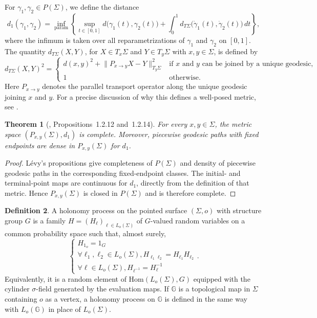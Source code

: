 \documentclass[11pt,a4paper,reqno]{article}
\newtheorem{theorem}{Theorem}[section]
\theoremstyle{definition}
\newtheorem{definition}[theorem]{Definition}
\theoremstyle{remark}
\newcommand\Hom{\mathrm{Hom}}
\newcommand\Gbb{{\mathbb{G}}}
\begin{document}
For $\gamma_1,\gamma_2\in P(\Sigma)$, we define the distance
\begin{equation}
 d_1(\gamma_1,\gamma_2)
 = \inf_{\text{param}} \left\{
 \sup_{t\in [0,1]} d\big(\gamma_1(t),\gamma_2(t)\big)
 + \int_0^1 d_{T\Sigma}\big(\dot{\gamma}_1(t),\dot{\gamma}_2(t)\big)\,dt
 \right\},
\end{equation}
where the infimum is taken over all reparametrizations of $\gamma_1$ and $\gamma_2$ on $[0,1]$. 
The quantity $d_{T\Sigma}(X,Y)$, for $X\in T_x\Sigma$ and $Y\in T_y\Sigma$ with $x,y\in \Sigma$, is defined by
\begin{equation}
 d_{T\Sigma}(X,Y)^2= 
 \begin{cases}
 d(x,y)^2 + \big\|P_{x\to y}X - Y\big\|_{T_y\Sigma}^2 
 & \text{if $x$ and $y$ can be joined by a unique geodesic}, \\
 1 & \text{otherwise}.
 \end{cases}
\end{equation}
Here $P_{x\to y}$ denotes the parallel transport operator along the unique geodesic joining $x$ and $y$. 
For a precise discussion of why this defines a well-posed metric, see \cite[Section~1.2.2]{Lev10}.
\begin{theorem}[\cite{Lev10}, Propositions~1.2.12 and~1.2.14]
\label{thm:Levy-d1-complete-rewrite}
For every $x,y\in\Sigma$, the metric space $(P_{x,y}(\Sigma),d_1)$ is complete. Moreover, piecewise geodesic paths with fixed endpoints are dense in $P_{x,y}(\Sigma)$ for $d_1$.
\end{theorem}

\begin{proof}
L\'evy's propositions give completeness of $P(\Sigma)$ and density of piecewise geodesic paths in the corresponding fixed-endpoint classes. The initial- and terminal-point maps are continuous for $d_1$, directly from the definition of that metric. Hence $P_{x,y}(\Sigma)$ is closed in $P(\Sigma)$ and is therefore complete.
\end{proof}
\begin{definition}\label{def:holonomy-process}
A holonomy process on the pointed surface $(\Sigma,o)$ with structure group $G$ is a family $H=(H_\ell)_{\ell\in L_o(\Sigma)}$ of $G$-valued random variables on a common probability space such that, almost surely,
\[ \begin{cases}
 H_{1_o}=1_G \\
 \forall \ell_1,\ell_2\in L_o(\Sigma), H_{\ell_1\ell_2}=H_{\ell_1}H_{\ell_2} \\
 \forall \ell\in L_o(\Sigma), H_{\ell^{-1}}=H_\ell^{-1}
\end{cases}.
\]
Equivalently, it is a random element of $\Hom(L_o(\Sigma),G)$ equipped with the cylinder $\sigma$-field generated by the evaluation maps. If $\Gbb$ is a topological map in $\Sigma$ containing $o$ as a vertex, a holonomy process on $\Gbb$ is defined in the same way with $L_o(\Gbb)$ in place of $L_o(\Sigma)$.
\end{definition}
\end{document}

